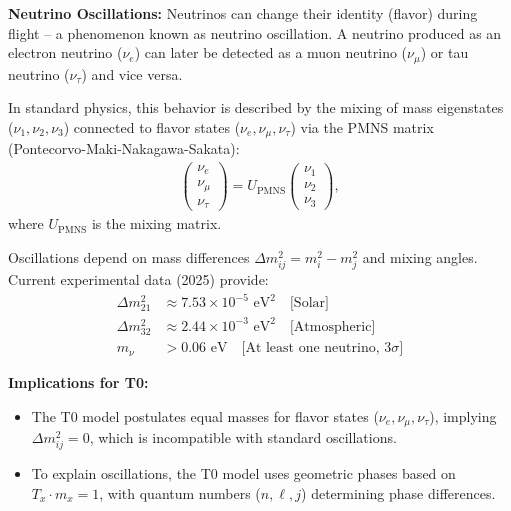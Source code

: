 \documentclass[12pt,a4paper]{article}
\begin{document}
	\begin{important}
		\textbf{Neutrino Oscillations:} Neutrinos can change their identity (flavor) during flight -- a phenomenon known as neutrino oscillation. A neutrino produced as an electron neutrino (\(\nu_e\)) can later be detected as a muon neutrino (\(\nu_\mu\)) or tau neutrino (\(\nu_\tau\)) and vice versa.
		
		In standard physics, this behavior is described by the mixing of mass eigenstates (\(\nu_1, \nu_2, \nu_3\)) connected to flavor states (\(\nu_e, \nu_\mu, \nu_\tau\)) via the PMNS matrix (Pontecorvo-Maki-Nakagawa-Sakata):
		\begin{align}
			\begin{pmatrix}
				\nu_e \\ \nu_\mu \\ \nu_\tau
			\end{pmatrix}
			=
			U_{\text{PMNS}}
			\begin{pmatrix}
				\nu_1 \\ \nu_2 \\ \nu_3
			\end{pmatrix},
		\end{align}
		where \(U_{\text{PMNS}}\) is the mixing matrix.
		
		Oscillations depend on mass differences \(\Delta m^2_{ij} = m_i^2 - m_j^2\) and mixing angles. Current experimental data (2025) provide:
		\begin{align}
			\Delta m^2_{21} &\approx 7.53 \times 10^{-5} \text{ eV}^2 \quad \text{[Solar]} \\
			\Delta m^2_{32} &\approx 2.44 \times 10^{-3} \text{ eV}^2 \quad \text{[Atmospheric]} \\
			m_\nu &> 0.06 \text{ eV} \quad \text{[At least one neutrino, 3}\sigma\text{]}
		\end{align}
		
		\textbf{Implications for T0:}
		\begin{itemize}
			\item The T0 model postulates equal masses for flavor states (\(\nu_e, \nu_\mu, \nu_\tau\)), implying \(\Delta m^2_{ij} = 0\), which is incompatible with standard oscillations.
			\item To explain oscillations, the T0 model uses geometric phases based on \( T_x \cdot m_x = 1 \), with quantum numbers (\(n, \ell, j\)) determining phase differences.
		\end{itemize}
	\end{important}
	
\end{document}
